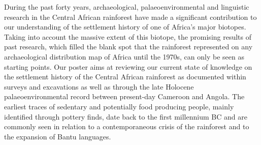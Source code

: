 \documentclass[a0]{sciposter}
\begin{document}
{\begin{minipage}[t][102cm][t]{82cm}
\vspace{2cm}\hspace{2cm}\begin{minipage}[t]{77cm} %
{\fontsize{28}{36} \selectfont During the past forty years, archaeological, palaeoenvironmental and linguistic research in the Central African rainforest have made a significant contribution to our understanding of the settlement history of one of Africa's major biotopes. Taking into account the massive extent of this biotope, the promising results of past research, which filled the blank spot that the rainforest represented on any archaeological distribution map of Africa until the 1970s, can only be seen as starting points. Our poster aims at reviewing our current state of knowledge on the settlement history of the Central African rainforest as documented within surveys and excavations as well as through the late Holocene palaeoenvironmental record between present-day Cameroon and Angola. The earliest traces of sedentary and potentially food producing people, mainly identified through pottery finds, date back to the first millennium BC and are commonly seen in relation to a contemporaneous crisis of the rainforest and to the expansion of Bantu languages.}
\end{minipage}

\vspace{1cm}
\hspace{2cm}\begin{minipage}[t]{77cm}
\begin{multicols}{3}


\end{multicols}
\end{minipage}
\end{minipage}}
\end{document}
